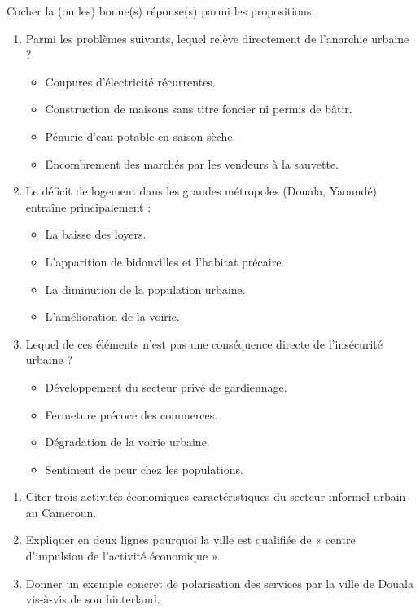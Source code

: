 \documentclass[11pt]{article}
\begin{document}
\begin{exercice}
Cocher la (ou les) bonne(s) réponse(s) parmi les propositions.
\begin{enumerate}
    \item Parmi les problèmes suivants, lequel relève directement de l'anarchie urbaine ?
    \begin{itemize}
        \item[A] Coupures d'électricité récurrentes.
        \item[B] Construction de maisons sans titre foncier ni permis de bâtir.
        \item[C] Pénurie d'eau potable en saison sèche.
        \item[D] Encombrement des marchés par les vendeurs à la sauvette.
    \end{itemize}
    \item Le déficit de logement dans les grandes métropoles (Douala, Yaoundé) entraîne principalement :
    \begin{itemize}
        \item[A] La baisse des loyers.
        \item[B] L'apparition de bidonvilles et l'habitat précaire.
        \item[C] La diminution de la population urbaine.
        \item[D] L'amélioration de la voirie.
    \end{itemize}
    \item Lequel de ces éléments n'est pas une conséquence directe de l'insécurité urbaine ?
    \begin{itemize}
        \item[A] Développement du secteur privé de gardiennage.
        \item[B] Fermeture précoce des commerces.
        \item[C] Dégradation de la voirie urbaine.
        \item[D] Sentiment de peur chez les populations.
    \end{itemize}
\end{enumerate}
\end{exercice}

\begin{exercice}
\begin{enumerate}
    \item Citer trois activités économiques caractéristiques du secteur informel urbain au Cameroun.
    \item Expliquer en deux lignes pourquoi la ville est qualifiée de « centre d’impulsion de l’activité économique ».
    \item Donner un exemple concret de polarisation des services par la ville de Douala vis-à-vis de son hinterland.
\end{enumerate}
\end{exercice}
\end{document}
